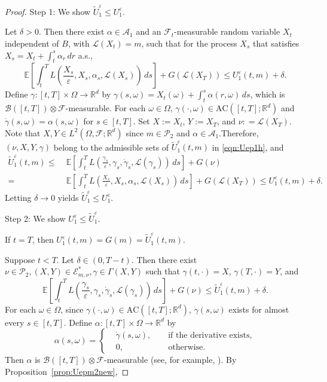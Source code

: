 \documentclass[reqno,11pt]{amsart}
\numberwithin{equation}{section}
\newcommand{\R}{\mathbb{R}} %
\newcommand{\e}{\varepsilon}
\newcommand{\ep}{\varepsilon}
\begin{document}
\begin{proof}
Step 1: We show $\tilde{U}_1^\ep\leq U_1^\ep$.

Let $\delta>0$. Then there exist $\alpha \in \mathcal{A}_1$ and an $\mathcal{F}_t$-measurable random variable $X_t$ independent of $B$, with $\mathcal{L}(X_t)=m$, such that for the process $X_s$ that satisfies $X_s=X_t+\int_t^s\alpha_r \,dr$ a.s.,
\[
\mathbb{E}\left[\int^T_{t}L\left(\frac{X_s}{\varepsilon},X_s,\alpha_s, \mathcal{L}(X_s)\right)\, ds \right]+G(\mathcal{L}(X_T)) \leq  U_1^\e(t, m)+\delta.
\]
Define $\gamma:[t, T] \times \Omega \to \R^d$ by $\gamma(s,\omega) =X_t(\omega)+\int_t^s \alpha(r,\omega)\,ds$, which is $\mathcal{B}([t,T]) \otimes\mathcal{F}$-measurable. For each $\omega\in \Omega$, $\gamma(\cdot, \omega) \in \mathrm{AC}([t,T];\R^d)$ and $\dot{\gamma}(s, \omega)=\alpha(s,\omega)$ for $s\in[t,T]$. Set $X:=X_{t}$, $Y:=X_T$, and $\nu: = \mathcal{L}(X_T)$. Note that $X, Y \in L^2(\Omega,\mathcal{F};\mathbb{R}^d)$ since $m\in \mathcal{P}_2$ and $\alpha\in \mathcal{A}_1$.Therefore, $(\nu, X,Y, \gamma)$ belong to the admissible sets of $\tilde{U}_1^\ep\left(t, m\right)$ in \eqref{eqn:Uep1h}, and
\[
\begin{aligned}
\tilde{U}_1^\ep(t,m)\leq &\; \mathbb{E}\left[
\int_{t}^T
L\left(
\frac{\gamma_s}{\e},
\gamma_s,
\dot{\gamma}_s,
\mathcal{L}(\gamma_s)
\right)\, ds
\right] +G(\nu) \\
= &\; \mathbb{E}\left[\int^T_{t}L\left(\frac{X_s}{\varepsilon},X_s,\alpha_s, \mathcal{L}(X_s)\right)\, ds \right]+G(\mathcal{L}(X_T)) \leq   U_1^\ep(t, m)+\delta.
\end{aligned}
\]
Letting $\delta \to 0$ yields $\tilde{U}_1^\ep\leq U_1^\ep$.

\noindent
Step 2: We show $U^\ep_1\leq \tilde{U}_1^\ep$.

If $t=T$, then $U^\ep_1(t,m)=G(m)=\tilde{U}_1^\ep\left(t, m\right)$.


Suppose $t<T$. Let $\delta \in \left(0, T- t\right)$. Then there exist $\nu \in \mathcal{P}_2, (X, Y)\in \mathcal{E}^\ast_{m,\nu}, \gamma\in \Gamma(X, Y)$ such that $\gamma \left(t, \cdot\right)=X$, $\gamma \left(T, \cdot\right)=Y$, and
\[
\mathbb{E}\left[
\int_{t}^T
L\left(
\frac{\gamma_s}{\e},
\gamma_s,
\dot{\gamma}_s,
\mathcal{L}(\gamma_s)
\right)\, ds
\right]  +G(\nu) \leq \tilde{U}_1^\ep(t, m)+\delta.
\]
For each $\omega \in \Omega$, since $\gamma(\cdot,\omega)\in \text{AC}([t,T];\mathbb{R}^d)$, $\dot{\gamma}(s,\omega)$ exists for almost every $s \in [t, T]$. Define $\alpha:[t, T] \times \Omega \to \R^d$ by
\[
\alpha(s,\omega)=\left\{
\begin{aligned}
&\dot{\gamma}(s,\omega),\qquad \text{if the derivative exists},\\
&0,\qquad \qquad \quad \, \, \text{otherwise}.
\end{aligned}
\right.
\]
Then $\alpha$ is $\mathcal{B}([t, T]) \otimes \mathcal{F}$-measurable (see, for example, \cite[Theorem 1]{Moshe_1977}). By Proposition~\ref{prop:Uepm2new},


\end{proof}
\end{document}
